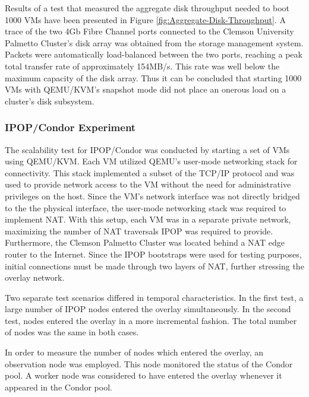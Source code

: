 Results of a test that measured the aggregate disk throughput needed
to boot 1000 VMs have been presented in Figure \ref{fig:Aggregate-Disk-Throughput}.
A trace of the two 4Gb Fibre  Channel ports connected to the Clemson
University Palmetto Cluster's disk array was obtained from the storage
management system. Packets were automatically load-balanced between
the two ports, reaching a peak total transfer rate of approximately
154MB/s. This rate was well below the maximum capacity of the disk
array. Thus it can be concluded that starting 1000 VMs with QEMU/KVM's
snapshot mode did not place an onerous load on a cluster's disk subsystem.

\subsubsection{\label{sub:IPOP/Condor-Experiment}IPOP/Condor Experiment }

The scalability test for IPOP/Condor was conducted by starting a set
of VMs using QEMU/KVM. Each VM utilized QEMU's user-mode networking
stack for connectivity. This stack implemented a subset of the TCP/IP
protocol and was used to provide network access to the VM without
the need for administrative privileges on the host. Since the VM's
network interface was not directly bridged to the the physical interface,
the user-mode networking stack was required to implement NAT. With
this setup, each VM was in a separate private network, maximizing
the number of NAT traversals IPOP was required to provide. Furthermore,
the Clemson Palmetto Cluster was located behind a NAT edge router
to the Internet. Since the IPOP bootstraps were used for testing purposes,
initial connections must be made through two layers of NAT, further
stressing the overlay network.

Two separate test scenarios differed in temporal characteristics.
In the first test, a large number of IPOP nodes entered the overlay
simultaneously. In the second test, nodes entered the overlay in a
more incremental fashion. The total number of nodes was the same in
both cases.

In order to measure the number of nodes which entered the overlay,
an observation node was employed. This node monitored the status of
the Condor pool. A worker node was considered to have entered the
overlay whenever it appeared in the Condor pool. 

